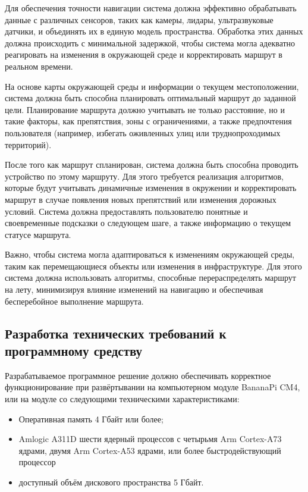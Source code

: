 Для обеспечения точности навигации система должна эффективно обрабатывать данные
с различных сенсоров, таких как камеры, лидары, ультразвуковые датчики, и
объединять их в единую модель пространства. Обработка этих данных должна
происходить с минимальной задержкой, чтобы система могла адекватно реагировать
на изменения в окружающей среде и корректировать маршрут в реальном времени.

На основе карты окружающей среды и информации о текущем местоположении, система
должна быть способна планировать оптимальный маршрут до заданной цели.
Планирование маршрута должно учитывать не только расстояние, но и такие факторы,
как препятствия, зоны с ограничениями, а также предпочтения пользователя
(например, избегать оживленных улиц или труднопроходимых территорий).

После того как маршрут спланирован, система должна быть способна проводить
устройство по этому маршруту. Для этого требуется реализация алгоритмов, которые
будут учитывать динамичные изменения в окружении и корректировать маршрут в
случае появления новых препятствий или изменения дорожных условий. Система
должна предоставлять пользователю понятные и своевременные подсказки о следующем
шаге, а также информацию о текущем статусе маршрута.

Важно, чтобы система могла адаптироваться к изменениям окружающей среды, таким
как перемещающиеся объекты или изменения в инфраструктуре. Для этого система
должна использовать алгоритмы, способные перераспределять маршрут на лету,
минимизируя влияние изменений на навигацию и обеспечивая бесперебойное
выполнение маршрута.

\subsection{Разработка технических требований к программному средству}
Разрабатываемое программное решение должно обеспечивать корректное
функционирование при развёртывании на компьютерном модуле BananaPi CM4, или
на модуле со следующими техническими характеристиками:

\begin{itemize}
	\item Оперативная память 4 Гбайт или более;
	\item Amlogic A311D шести ядерный процессов с четырьмя Arm Cortex-A73
		ядрами, двумя Arm Cortex-A53 ядрами, или более быстродействующий
		процессор
	\item доступный объём дискового пространства 5 Гбайт. %
\end{itemize}


